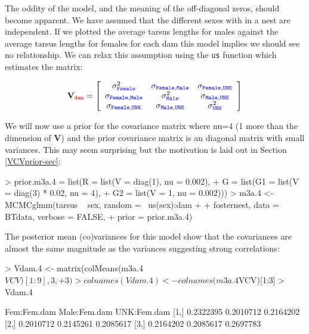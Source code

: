\documentclass{article}
\begin{document}
The oddity of the model, and the meaning of the off-diagonal zeros, should become apparent. We have assumed that the different sexes with in a nest are independent. If we plotted the average tarsus lengths for males against the average tarsus lengths for females for each dam this model implies we should see no relationship. We can relax this assumption using the \texttt{us} function which estimates the matrix: 

\begin{displaymath}
{\bf V}_{{\color{red} \texttt{dam}}}=
\left[
\begin{array}{ccc}
\sigma^{2}_{\color{blue}\texttt{Female}}&\sigma_{\color{blue}\texttt{Female}, \texttt{Male}}&\sigma_{\color{blue}\texttt{Female}, \texttt{UNK}}\\
\sigma_{\color{blue}\texttt{Female}, \texttt{Male}}&\sigma^{2}_{\color{blue}\texttt{Male}}&\sigma_{\color{blue}\texttt{Male}, \texttt{UNK}}\\
\sigma_{\color{blue}\texttt{Female}, \texttt{UNK}}&\sigma_{\color{blue}\texttt{Male}, \texttt{UNK}}&\sigma^{2}_{\color{blue}\texttt{UNK}}\\
\end{array}
\right]
\end{displaymath}

We will now use a prior for the covariance matrix where nu=4 (1 more than the dimension of {\bf V}) and the prior covariance matrix is an diagonal matrix with small variances. This may seem surprising but the motivation is laid out in Section \ref{VCVprior-sec}: 

\begin{Schunk}
\begin{Sinput}
> prior.m3a.4 = list(R = list(V = diag(1), nu = 0.002), 
+     G = list(G1 = list(V = diag(3) * 0.02, nu = 4), 
+         G2 = list(V = 1, nu = 0.002)))
> m3a.4 <- MCMCglmm(tarsus ~ sex, random = ~us(sex):dam + 
+     fosternest, data = BTdata, verbose = FALSE, 
+     prior = prior.m3a.4)
\end{Sinput}
\end{Schunk}

The posterior mean (co)variances for this model show that the covariances are almost the same magnitude as the variances suggesting strong correlations: 

\begin{Schunk}
\begin{Sinput}
> Vdam.4 <- matrix(colMeans(m3a.4$VCV)[1:9], 3, 
+     3)
> colnames(Vdam.4) <- colnames(m3a.4$VCV)[1:3]
> Vdam.4
\end{Sinput}
\begin{Soutput}
     Fem:Fem.dam Male:Fem.dam UNK:Fem.dam
[1,]   0.2322395    0.2010712   0.2164202
[2,]   0.2010712    0.2145261   0.2085617
[3,]   0.2164202    0.2085617   0.2697783
\end{Soutput}
\end{Schunk}
\end{document}
